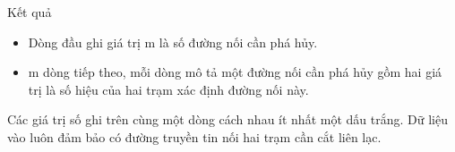 Kết quả
\begin{itemize}
	\item     Dòng đầu ghi giá trị m là số đường nối cần phá hủy.   
	\item     m dòng tiếp theo, mỗi dòng mô tả một đường nối cần phá hủy gồm hai giá trị là số hiệu của hai trạm xác định đường nối này.   
\end{itemize}

   Các giá trị số ghi trên cùng một dòng cách nhau ít nhất một dấu trắng. Dữ liệu vào luôn đảm bảo có đường truyền tin nối hai trạm cần cắt liên lạc.
